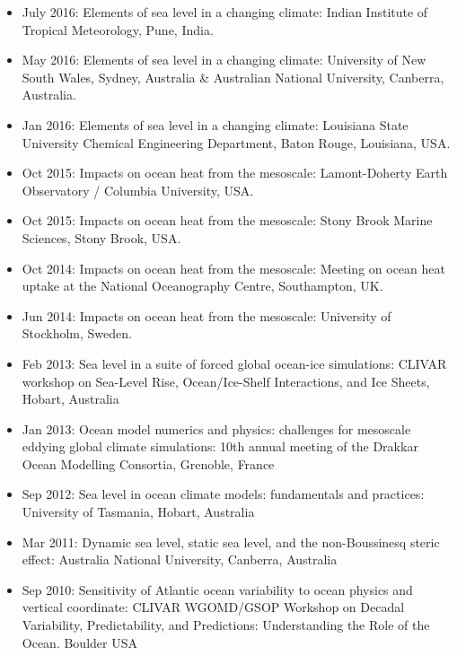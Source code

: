 \begin{itemize}[leftmargin=*]
\item July 2016: {\sc Elements of sea level in a changing climate}:
  Indian Institute of Tropical Meteorology, Pune, India.

\item May 2016: {\sc Elements of sea level in a changing climate}:
  University of New South Wales, Sydney, Australia \& Australian
  National University, Canberra, Australia.

\item Jan 2016: {\sc Elements of sea level in a changing climate}:
  Louisiana State University Chemical Engineering Department, Baton
  Rouge, Louisiana, USA.

\item Oct 2015: {\sc Impacts on ocean heat from the mesoscale}:
  Lamont-Doherty Earth Observatory / Columbia University, USA.

\item Oct 2015: {\sc Impacts on ocean heat from the mesoscale}: Stony
  Brook Marine Sciences, Stony Brook, USA.

\item Oct 2014: {\sc Impacts on ocean heat from the mesoscale}:
  Meeting on ocean heat uptake at the National Oceanography Centre,
  Southampton, UK.

\item Jun 2014: {\sc Impacts on ocean heat from the mesoscale}:
  University of Stockholm, Sweden.

\item Feb 2013: {\sc Sea level in a suite of forced global ocean-ice
    simulations}: CLIVAR workshop on Sea-Level Rise, Ocean/Ice-Shelf
  Interactions, and Ice Sheets, Hobart, Australia

\item Jan 2013: {\sc Ocean model numerics and physics: challenges for
    mesoscale eddying global climate simulations}: 10th annual meeting
  of the Drakkar Ocean Modelling Consortia, Grenoble, France

\item Sep 2012: {\sc Sea level in ocean climate models: fundamentals
    and practices}: University of Tasmania, Hobart, Australia
    
\item Mar 2011: {\sc Dynamic sea level, static sea level, and the
    non-Boussinesq steric effect}: Australia National University,
  Canberra, Australia

\item Sep 2010:  {\sc Sensitivity of Atlantic ocean variability to
    ocean physics and vertical coordinate}: CLIVAR WGOMD/GSOP Workshop
  on Decadal Variability, Predictability, and Predictions:
  Understanding the Role of the Ocean. Boulder USA 


\end{itemize}
